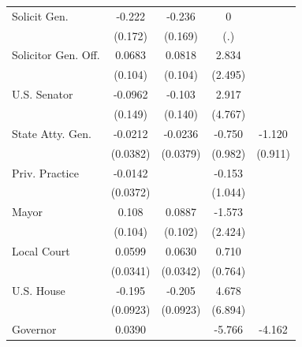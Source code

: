 {\begin{tabular}{l*{4}{c}}
\addlinespace
Solicit Gen.        &      -0.222        &      -0.236        &           0        &                    \\
                    &     (0.172)        &     (0.169)        &         (.)        &                    \\
\addlinespace
Solicitor Gen. Off. &      0.0683        &      0.0818        &       2.834        &                    \\
                    &     (0.104)        &     (0.104)        &     (2.495)        &                    \\
\addlinespace
U.S. Senator        &     -0.0962        &      -0.103        &       2.917        &                    \\
                    &     (0.149)        &     (0.140)        &     (4.767)        &                    \\
\addlinespace
State Atty. Gen.    &     -0.0212        &     -0.0236        &      -0.750        &      -1.120        \\
                    &    (0.0382)        &    (0.0379)        &     (0.982)        &     (0.911)        \\
\addlinespace
Priv. Practice      &     -0.0142        &                    &      -0.153        &                    \\
                    &    (0.0372)        &                    &     (1.044)        &                    \\
\addlinespace
Mayor               &       0.108        &      0.0887        &      -1.573        &                    \\
                    &     (0.104)        &     (0.102)        &     (2.424)        &                    \\
\addlinespace
Local Court         &      0.0599\sym{+} &      0.0630\sym{+} &       0.710        &                    \\
                    &    (0.0341)        &    (0.0342)        &     (0.764)        &                    \\
\addlinespace
U.S. House          &      -0.195\sym{*} &      -0.205\sym{*} &       4.678        &                    \\
                    &    (0.0923)        &    (0.0923)        &     (6.894)        &                    \\
\addlinespace
Governor            &      0.0390        &                    &      -5.766        &      -4.162        \\

\end{tabular}}
